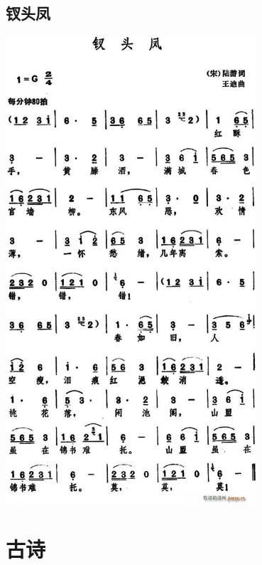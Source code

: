 \documentclass[cn,pad,chinesefont=nofont,twocol]{elegantbook}
\begin{document}
\section{钗头凤}
    \includegraphics[width=0.7\textwidth]{dongxiao/20200808-钗头凤-陆游.jpg}                             
                             
 
\chapter{古诗}  
\end{document}

